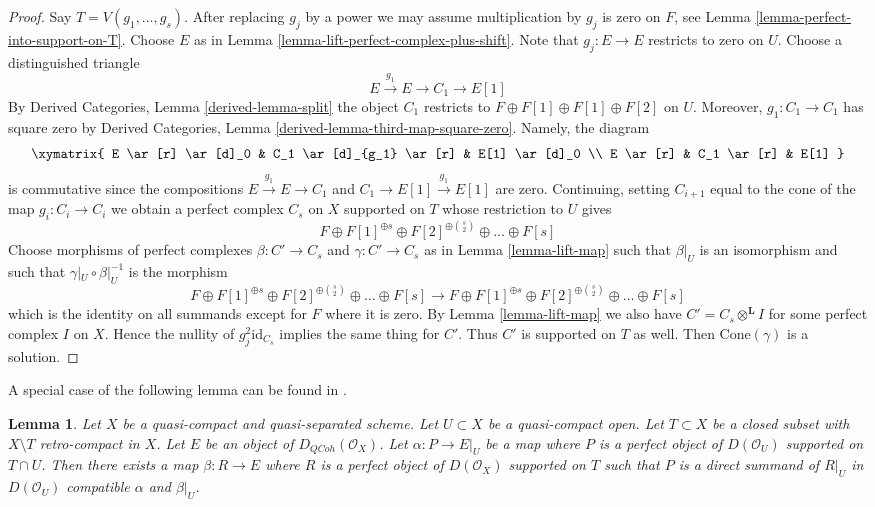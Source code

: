 \documentclass{stacks-project}
\theoremstyle{plain}
\newtheorem{lemma}[subsection]{Lemma}
\theoremstyle{definition}
\theoremstyle{remark}
\numberwithin{equation}{subsection}
\def\QCoh{\mathit{QCoh}}
\begin{document}
\begin{proof}
Say $T = V(g_1, \ldots, g_s)$. After replacing $g_j$ by a power we
may assume multiplication by $g_j$ is zero on $F$, see
Lemma \ref{lemma-perfect-into-support-on-T}. Choose $E$ as in
Lemma \ref{lemma-lift-perfect-complex-plus-shift}.
Note that $g_j : E \to E$ restricts to zero on $U$.
Choose a distinguished triangle
$$
E \xrightarrow{g_1} E \to C_1 \to E[1]
$$
By Derived Categories, Lemma \ref{derived-lemma-split}
the object $C_1$ restricts to
$F \oplus F[1] \oplus F[1] \oplus F[2]$ on $U$.
Moreover, $g_1 : C_1 \to C_1$ has square zero by
Derived Categories, Lemma \ref{derived-lemma-third-map-square-zero}.
Namely, the diagram
$$
\xymatrix{
E \ar[r] \ar[d]_0 & C_1 \ar[d]_{g_1} \ar[r] & E[1] \ar[d]_0 \\
E \ar[r] & C_1 \ar[r] & E[1]
}
$$
is commutative since the compositions $E \xrightarrow{g_1} E \to C_1$ and
$C_1 \to E[1] \xrightarrow{g_1} E[1]$ are zero. Continuing, setting
$C_{i + 1}$ equal to the cone of the map $g_i : C_i \to C_i$ we obtain
a perfect complex $C_s$ on $X$ supported on $T$
whose restriction to $U$ gives
$$
F \oplus F[1]^{\oplus s} \oplus F[2]^{\oplus {s \choose 2}}
\oplus \ldots \oplus F[s]
$$
Choose morphisms of perfect complexes $\beta : C' \to C_s$
and $\gamma : C' \to C_s$ as in Lemma \ref{lemma-lift-map}
such that $\beta|_U$ is an isomorphism and such that
$\gamma|_U \circ \beta|_U^{-1}$ is the morphism
$$
F \oplus F[1]^{\oplus s} \oplus F[2]^{\oplus {s \choose 2}}
\oplus \ldots \oplus F[s]
\to
F \oplus F[1]^{\oplus s} \oplus F[2]^{\oplus {s \choose 2}}
\oplus \ldots \oplus F[s]
$$
which is the identity on all summands except for $F$ where it is zero.
By Lemma \ref{lemma-lift-map} we also have
$C' = C_s \otimes^\mathbf{L} I$ for some perfect complex
$I$ on $X$. Hence the nullity of $g_j^2\text{id}_{C_s}$ implies the
same thing for $C'$. Thus $C'$ is supported on $T$ as well.
Then $\text{Cone}(\gamma)$ is a solution.
\end{proof}

\noindent
A special case of the following lemma can be found in
\cite{Neeman-Grothendieck}.

\begin{lemma}
\label{lemma-lift-map-from-perfect-complex-with-support}
Let $X$ be a quasi-compact and quasi-separated scheme.
Let $U \subset X$ be a quasi-compact open. Let $T \subset X$
be a closed subset with $X \setminus T$ retro-compact in $X$.
Let $E$ be an object of $D_\QCoh(\mathcal{O}_X)$.
Let $\alpha : P \to E|_U$ be a map where $P$ is a perfect object of
$D(\mathcal{O}_U)$ supported on $T \cap U$. Then there exists a map
$\beta : R \to E$ where $R$ is a perfect object of $D(\mathcal{O}_X)$
supported on $T$ such that $P$ is a direct summand of $R|_U$ in
$D(\mathcal{O}_U)$ compatible $\alpha$ and $\beta|_U$.
\end{lemma}
\end{document}
